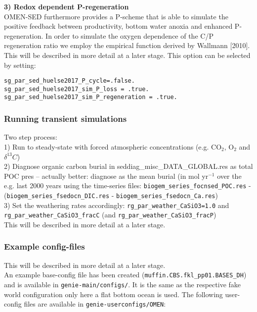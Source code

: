\documentclass[11pt,fleqn]{book} %
\begin{document}
\vspace{1mm}
\noindent 
\textbf{3) Redox dependent P-regeneration}\\
OMEN-SED furthermore provides a P-scheme that is able to simulate the positive feedback between productivity, bottom water anoxia and enhanced P-regeneration. In order to simulate the oxygen dependence of the C/P regeneration ratio we employ the 
empirical function derived by Wallmann [2010]. This will be described in more detail at a later stage. This option can be selected by setting:
\vspace{-2mm}\begin{verbatim}
sg_par_sed_huelse2017_P_cycle=.false.
sg_par_sed_huelse2017_sim_P_loss = .true.
sg_par_sed_huelse2017_sim_P_regeneration = .true.
\end{verbatim}\vspace{-2mm}

%
\subsubsection*{Running transient simulations}
Two step process:\\
1) Run to steady-state with forced atmospheric concentrations (e.g. CO$_2$, O$_2$ and \(\delta^{13}C\))\\
2) Diagnose organic carbon burial in seddiag\_misc\_DATA\_GLOBAL.res as total POC pres -- actually better: diagnose as the mean burial (in mol yr$^{-1}$ over the e.g. last 2000 years using the time-series files: 
 \texttt{biogem\_series\_focnsed\_POC.res} - (\texttt{biogem\_series\_fsedocn\_DIC.res} - \texttt{biogem\_series\_fsedocn\_Ca.res})\\
3) Set the weathering rates accordingly: \texttt{rg\_par\_weather\_CaSiO3=1.0} and \texttt{rg\_par\_weather\_CaSiO3\_fracC} (and \texttt{rg\_par\_weather\_CaSiO3\_fracP})\\
This will be described in more detail at a later stage.
 
%
\subsubsection*{Example config-files}
This will be described in more detail at a later stage.\\
An example base-config file has been created (\texttt{muffin.CBS.fkl\_pp01.BASES\_DH}) and is available in \texttt{genie-main/configs/}. It is the same as the respective fake world configuration only here a flat bottom ocean is used. The following 
user-config files are available in \texttt{genie-userconfigs/OMEN}:\\ 
\end{document}
